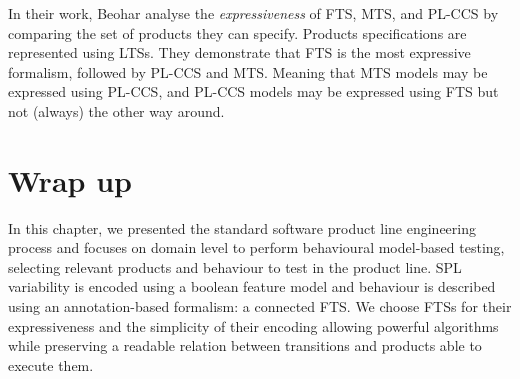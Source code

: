 In their work, Beohar \etal \cite{Beohar2015} analyse the \emph{expressiveness} of \gls{FTS}, \gls{MTS}, and PL-CCS by comparing the set of products they can specify. Products specifications are represented using \glspl{LTS}. They demonstrate that \gls{FTS} is the most expressive formalism, followed by \gls{PL-CCS} and \gls{MTS}. Meaning that \gls{MTS} models may be expressed using \gls{PL-CCS}, and \gls{PL-CCS} models may be expressed using \gls{FTS} but not (always) the other way around.


\section{Wrap up}

In this chapter, we presented the standard software product line engineering process and focuses on domain level to perform behavioural model-based testing, \ie selecting relevant products and behaviour to test in the product line. \gls{SPL} variability is encoded using a boolean \gls{feature model} and behaviour is described using an annotation-based formalism: a connected \gls{FTS}. We choose \glspl{FTS} for their expressiveness and the simplicity of their encoding allowing powerful algorithms \cite{Classen2013b,Cordy2013} while preserving a readable relation between transitions and products able to execute them.

